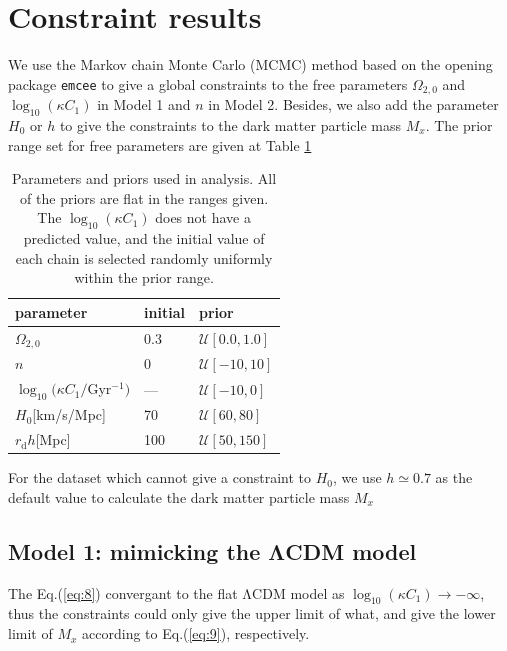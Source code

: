 \documentclass[twocolumn]{aastex631}
\begin{document}
\section{Constraint results}

   We use the Markov chain Monte Carlo (MCMC) method based 
   on the opening package \texttt{emcee} to give a global constraints
   to the free parameters $\Omega_{2,0}$ and $\log_{10}(\kappa C_1)$ in 
   Model 1 and $n$ in Model 2.
   Besides, we also add the parameter $H_0$ or $h$ to give the constraints
   to the dark matter particle mass $M_x$.
   The prior range set for free parameters are given at Table \ref{tab:4}

   \begin{table}
      \centering
      \begin{tabular}{lll}
         \hline\hline
         parameter & initial & prior \\
         \hline
         $\Omega_{2,0}$ & 0.3 & $\mathcal{U}[0.0,1.0]$ \\
         $n$ & 0 & $\mathcal{U}[-10,10]$ \\
         $\log_{10}(\kappa C_1/$Gyr${}^{-1})$ & --- & $\mathcal{U}[-10,0]$ \\
         $H_0$[km/s/Mpc] & 70 & $\mathcal{U}[60,80]$ \\
         \hline
         $r_{\text{d}}h$[Mpc] & 100 & $\mathcal{U}[50,150]$ \\
         \hline
      \end{tabular}
      \caption{Parameters and priors used in analysis. 
      All of the priors are flat in the ranges given. 
      The $\log_{10}(\kappa C_1)$ does not have a predicted value, 
      and the initial value of each chain is selected randomly uniformly
      within the prior range.}
      \label{tab:4}
   \end{table}

   For the dataset which cannot give a constraint to $H_0$, 
   we use $h \simeq 0.7$ as the default value to calculate the 
   dark matter particle mass $M_x$

\subsection{Model 1: mimicking the ΛCDM model}

   The Eq.(\ref{eq:8}) convergant to the flat ΛCDM model as
   $\log_{10}(\kappa C_1)\to-\infty$, thus the constraints
   could only give the upper limit of what, and give the lower limit
   of $M_x$ according to Eq.(\ref{eq:9}), respectively.
\end{document}
